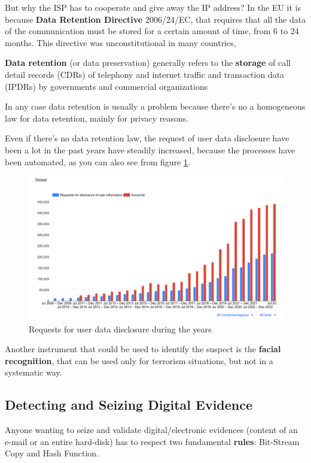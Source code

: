 But why the ISP has to cooperate and give away the IP address?
In the EU it is because \textbf{Data Retention Directive} 2006/24/EC,
that requires that all the data of the communication must be stored
for a certain amount of time, from 6 to 24 months. This directive was
unconstitutional in many countries,
\begin{boxH}
  \textbf{Data retention} (or data preservation) generally refers to
  the \textbf{storage} of call detail records (CDRs) of telephony and
  internet traffic and transaction data (IPDRs) by governments and
  commercial organizations
\end{boxH}
In any case data retention is usually a problem because there's no a
homogeneous law for data retention, mainly for privacy reasons.

Even if there's no data retention law, the request of user data
disclosure have been a lot in the past years have steadily increased,
because the processes have been automated, as you can also see from
figure \ref{fig:disclosure-req}.

\begin{figure}[H]
  \centering
  \includegraphics[scale=.4]{img/disclosure requests.png}
  \caption{Requests for user data disclosure during the years}
  \label{fig:disclosure-req}
\end{figure}
Another instrument that could be used to identify the suspect is the
\textbf{facial recognition}, that can be used only for terrorism
situations, but not in a systematic way.
\subsection{Detecting and Seizing Digital Evidence}
Anyone wanting to seize and validate digital/electronic evidences
(content of an e-mail or an entire hard-disk) has to respect two
fundamental \textbf{rules}: Bit-Stream Copy and Hash Function.
